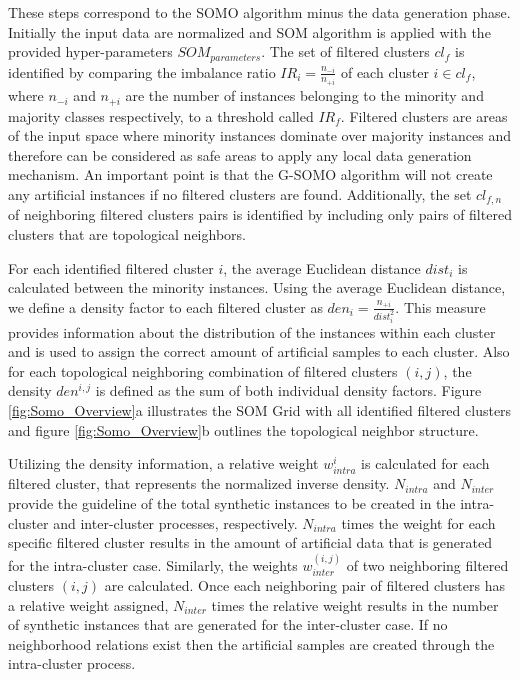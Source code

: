 \documentclass[parskip=full]{scrartcl}
\begin{document}
These steps correspond to the SOMO algorithm minus the data generation phase.
Initially the input data are normalized and SOM algorithm is applied with the
provided hyper-parameters $SOM_{parameters}$. The set of filtered clusters
$cl_{f}$ is identified by comparing the imbalance ratio $IR_{i} =
\frac{n_{-i}}{n_{+i}}$ of each cluster $i \in cl_{f}$, where $n_{-i}$ and
$n_{+i}$ are the number of instances belonging to the minority and majority
classes respectively, to a threshold called $IR_{f}$. Filtered clusters are
areas of the input space where minority instances dominate over majority
instances and therefore can be considered as safe areas to apply any local data
generation mechanism. An important point is that the G-SOMO algorithm will not
create any artificial instances if no filtered clusters are found. Additionally,
the set $cl_{f, n}$ of neighboring filtered clusters pairs is identified by
including only pairs of filtered clusters that are topological neighbors.

For each identified filtered cluster $i$, the average Euclidean distance
$dist_{i}$ is calculated between the minority instances. Using the average
Euclidean distance, we define a density factor to each filtered cluster as
$den_{i} = \frac{n_{+i}}{dist_{i}^2}$. This measure provides information about
the distribution of the instances within each cluster and is used to assign the
correct amount of artificial samples to each cluster. Also for each topological
neighboring combination of filtered clusters $(i, j)$, the density $den^{i, j}$
is defined as the sum of both individual density factors. Figure
\ref{fig:Somo_Overview}a illustrates the SOM Grid with all identified filtered
clusters and figure \ref{fig:Somo_Overview}b outlines the topological neighbor
structure.

Utilizing the density information, a relative weight $w^{i}_{intra}$ is
calculated for each filtered cluster, that represents the normalized inverse
density. $N_{intra}$ and $N_{inter}$ provide the guideline of the total
synthetic instances to be created in the intra-cluster and inter-cluster
processes, respectively. $N_{intra}$ times the weight for each specific filtered
cluster results in the amount of artificial data that is generated for the
intra-cluster case. Similarly, the weights $w^{(i, j)}_{inter}$ of two
neighboring filtered clusters $(i, j)$ are calculated. Once each neighboring
pair of filtered clusters has a relative weight assigned, $N_{inter}$ times the
relative weight results in the number of synthetic instances that are generated
for the inter-cluster case. If no neighborhood relations exist then the
artificial samples are created through the intra-cluster process.
\end{document}
